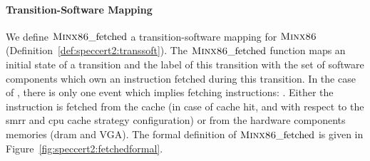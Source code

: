 \paragraph{Transition-Software Mapping}
%
We define \(\textsc{Minx86}\mathrm{\_fetched}\) a transition-software mapping for
$\textsc{Minx86}$ (Definition~\ref{def:speccert2:transsoft}).
%
The \(\textsc{Minx86}\mathrm{\_fetched}\) function maps an initial state of a
transition and the label of this transition with the set of software components
which own an instruction fetched during this transition.
%
In the case of , there is only one event which implies
fetching instructions: .
%
Either the instruction is fetched from the cache (in case of cache hit, and with
respect to the \ac{smrr} and \ac{cpu} cache strategy configuration) or from the
hardware components memories (\ac{dram} and VGA).
%
The formal definition of \(\textsc{Minx86}\mathrm{\_fetched}\) is given in
Figure~\ref{fig:speccert2:fetchedformal}.


